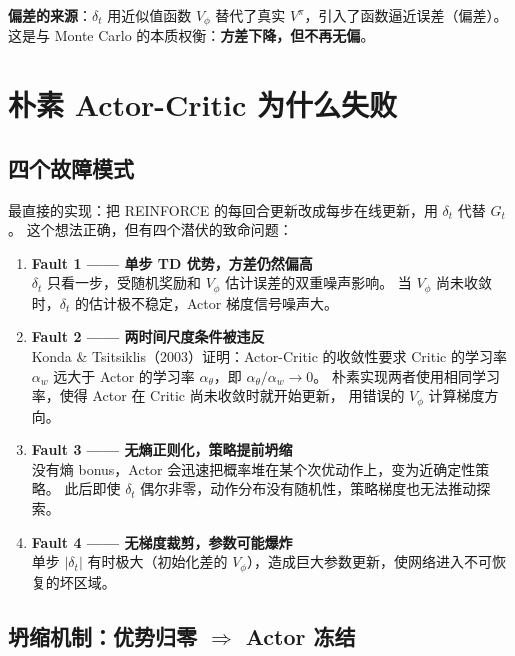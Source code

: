 \documentclass{article}
\begin{document}
\textbf{偏差的来源}：$\delta_t$ 用近似值函数 $V_\phi$ 替代了真实 $V^\pi$，引入了函数逼近误差（偏差）。
这是与 Monte Carlo 的本质权衡：\textbf{方差下降，但不再无偏}。

\section*{朴素 Actor-Critic 为什么失败}

\subsection*{四个故障模式}

最直接的实现：把 REINFORCE 的每回合更新改成每步在线更新，用 $\delta_t$ 代替 $G_t$。
这个想法正确，但有四个潜伏的致命问题：

\begin{enumerate}
  \item \textbf{Fault 1 —— 单步 TD 优势，方差仍然偏高}\\
        $\delta_t$ 只看一步，受随机奖励和 $V_\phi$ 估计误差的双重噪声影响。
        当 $V_\phi$ 尚未收敛时，$\delta_t$ 的估计极不稳定，Actor 梯度信号噪声大。

  \item \textbf{Fault 2 —— 两时间尺度条件被违反}\\
        Konda \& Tsitsiklis（2003）证明：Actor-Critic 的收敛性要求 Critic 的学习率
        $\alpha_w$ 远大于 Actor 的学习率 $\alpha_\theta$，即 $\alpha_\theta / \alpha_w \to 0$。
        朴素实现两者使用相同学习率，使得 Actor 在 Critic 尚未收敛时就开始更新，
        用错误的 $V_\phi$ 计算梯度方向。

  \item \textbf{Fault 3 —— 无熵正则化，策略提前坍缩}\\
        没有熵 bonus，Actor 会迅速把概率堆在某个次优动作上，变为近确定性策略。
        此后即使 $\delta_t$ 偶尔非零，动作分布没有随机性，策略梯度也无法推动探索。

  \item \textbf{Fault 4 —— 无梯度裁剪，参数可能爆炸}\\
        单步 $|\delta_t|$ 有时极大（初始化差的 $V_\phi$），造成巨大参数更新，使网络进入不可恢复的坏区域。
\end{enumerate}

\subsection*{坍缩机制：优势归零 $\Rightarrow$ Actor 冻结}
\end{document}
